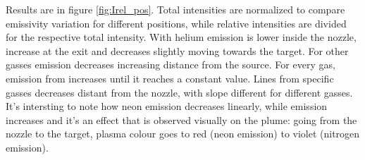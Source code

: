 Results are in figure \ref{fig:Irel_pos}. Total intensities are normalized to compare emissivity variation for different positions, while relative intensities are divided for the respective total intensity.
With helium emission is lower inside the nozzle, increase at the exit and decreases slightly moving towards the target. For other gasses emission decreases increasing distance from the source.
For every gas, emission from  increases until it reaches a constant value.
Lines from specific gasses decreases distant from the nozzle, with slope different for different gasses.
It's intersting to note how neon emission decreases linearly, while  emission increases and it's an effect that is observed visually on the plume: going from the nozzle to the target, plasma colour goes to red (neon emission) to violet (nitrogen emission).
\begin{figure}
\centering
  
  

\end{figure}
